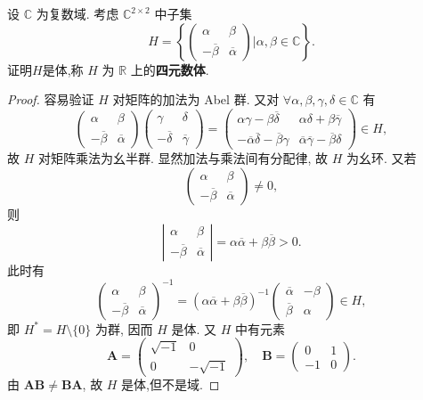 \documentclass[../../main.tex]{subfiles}%
\begin{document}
\begin{theorem}\label{theorem:抽象代数--例题1.4.8}
设 \( \mathbb{C} \) 为复数域. 考虑 \( \mathbb{C}^{2 \times 2} \) 中子集
\[
H = \left\{ \begin{pmatrix} \alpha & \beta \\ -\overline{\beta} & \overline{\alpha} \end{pmatrix} \bigg| \alpha,\beta \in \mathbb{C} \right\}.
\]
证明$H$是体,称 \( H \) 为 \( \mathbb{R} \) 上的\textbf{四元数体}.
\end{theorem}
\begin{proof}

容易验证 \( H \) 对矩阵的加法为 Abel 群. 又对 \( \forall \alpha,\beta,\gamma,\delta \in \mathbb{C} \) 有
\[
\begin{pmatrix} \alpha & \beta \\ -\overline{\beta} & \overline{\alpha} \end{pmatrix} \begin{pmatrix} \gamma & \delta \\ -\overline{\delta} & \overline{\gamma} \end{pmatrix} = \begin{pmatrix} \alpha\gamma - \beta\overline{\delta} & \alpha\delta + \beta\overline{\gamma} \\ -\overline{\alpha}\overline{\delta} - \overline{\beta}\gamma & \overline{\alpha}\overline{\gamma} - \overline{\beta}\delta \end{pmatrix} \in H,
\]
故 \( H \) 对矩阵乘法为幺半群. 显然加法与乘法间有分配律, 故 \( H \) 为幺环. 又若
\[
\begin{pmatrix} \alpha & \beta \\ -\overline{\beta} & \overline{\alpha} \end{pmatrix} \neq 0,
\]
则
\[
\left| \begin{array}{cc} \alpha & \beta \\ -\overline{\beta} & \overline{\alpha} \end{array} \right| = \alpha\overline{\alpha} + \beta\overline{\beta} > 0.
\]
此时有
\[
\begin{pmatrix} \alpha & \beta \\ -\overline{\beta} & \overline{\alpha} \end{pmatrix}^{-1} = (\alpha\overline{\alpha} + \beta\overline{\beta})^{-1} \begin{pmatrix} \overline{\alpha} & -\beta \\ \overline{\beta} & \alpha \end{pmatrix} \in H,
\]
即 \( H^* = H \setminus \{0\} \) 为群, 因而 \( H \) 是体. 又 \( H \) 中有元素
\[
\boldsymbol{A} = \begin{pmatrix} \sqrt{-1} & 0 \\ 0 & -\sqrt{-1} \end{pmatrix}, \quad \boldsymbol{B} = \begin{pmatrix} 0 & 1 \\ -1 & 0 \end{pmatrix}.
\]
由 \( \boldsymbol{AB} \neq \boldsymbol{BA} \), 故 \( H \) 是体,但不是域.

\end{proof}
\end{document}
